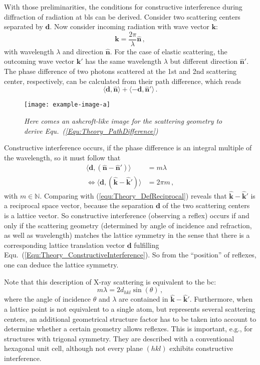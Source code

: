 With those preliminarities, the conditions for constructive interference during dif\-frac\-tion of radiation at \glspl{bl} can be derived.
Consider two scattering centers separated by $\mathbf{d}$.
Now consider incoming radiation with wave vector $\mathbf{k}$:
\begin{equation}
        \mathbf{k}=\frac{2\pi}{\lambda}\hat{\mathbf{n}}\,,
\end{equation}
with wavelength $\lambda$ and direction $\hat{\mathbf{n}}$.
For the case of elastic scattering, the outcoming wave vector $\mathbf{k}'$ has the same wavelength $\lambda$ but different direction $\hat{\mathbf{n}}'$.
The phase difference of two photons scattered at the 1st and 2nd scattering center, respectively, can be calculated from their path difference, which reads
\begin{equation}\label{Equ:Theory_PathDifference}
    \langle\mathbf{d},\hat{\mathbf{n}}\rangle+\langle-\mathbf{d},\hat{\mathbf{n}}'\rangle\,.
\end{equation}
\begin{figure}
    \centering
    \texttt{[image: example-image-a]}
    \caption{\textit{Here comes an ashcroft-like image for the scattering geometry to derive Equ.~(\ref{Equ:Theory_PathDifference})}}
\end{figure}
Constructive interference occurs, if the phase difference is an integral multiple of the wavelength, so it must follow that
\begin{align}
    \langle\mathbf{d},(\hat{\mathbf{n}}-\hat{\mathbf{n}}')\rangle&=m\lambda\\
    \Leftrightarrow\langle\mathbf{d},(\hat{\mathbf{k}}-\hat{\mathbf{k}}')\rangle&=2\pi m\,,
    \label{Equ:Theory_ConstructiveInterference}
\end{align}
with $m\in\mathbb{N}$.
Comparing with (\ref{equ:Theory_DefReciprocal}) reveals that $\hat{\mathbf{k}}-\hat{\mathbf{k}}'$ is a reciprocal space vector, because the separation $\mathbf{d}$ of the two scattering centers is a lattice vector.
So constructive interference (observing a reflex) occurs if and only if the scattering geometry (determined by angle of incidence and refraction, as well as wavelength) matches the lattice symmetry in the sense that there is a corresponding lattice translation vector $\mathbf{d}$ fulfilling Equ.~(\ref{Equ:Theory_ConstructiveInterference}).
So from the \enquote{position} of reflexes, one can deduce the lattice symmetry.

Note that this description of X-ray scattering is equivalent to the \gls{bc}:
\begin{equation}\label{Equ:Theory_BraggCondition}
    m\lambda=2d_{hkl}\sin(\theta)\,,
\end{equation}
where the angle of incidence $\theta$ and $\lambda$ are contained in $\hat{\mathbf{k}}-\hat{\mathbf{k}}'$.
Furthermore, when a lattice point is not equivalent to a single atom, but represents several scattering centers, an additional geometrical structure factor has to be taken into account to determine whether a certain geometry allows reflexes.
This is important, e.g., for structures with trigonal symmetry. 
They are described with a conventional hexagonal unit cell, although not every plane $(hkl)$ exhibits constructive interference.

